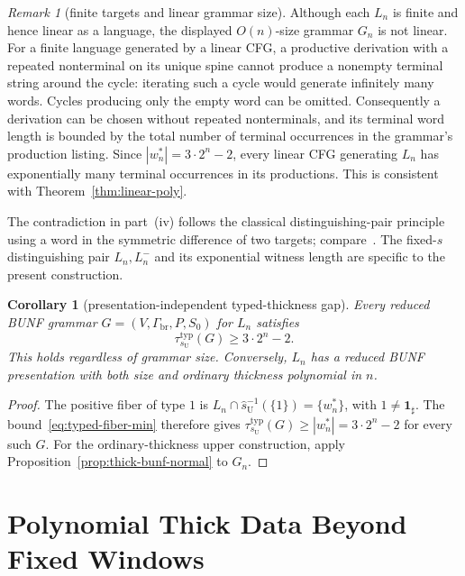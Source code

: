 \documentclass[11pt,a4paper]{article}
\newtheorem{corollary}[theorem]{Corollary}
\theoremstyle{remark}
\newtheorem{remark}[theorem]{Remark}
\theoremstyle{plain}
\begin{document}
\begin{remark}[finite targets and linear grammar size]
Although each $L_n$ is finite and hence linear as a language,
the displayed $O(n)$-size grammar $G_n$ is not linear.
For a finite language generated by a linear CFG, a productive
derivation with a repeated nonterminal on its unique spine
cannot produce a nonempty terminal string around the cycle:
iterating such a cycle would generate infinitely many words.
Cycles producing only the empty word can be omitted.
Consequently a derivation can be chosen without repeated
nonterminals, and its terminal word length is bounded by
the total number of terminal occurrences in the grammar's
production listing. Since $|w_n^*|=3\cdot2^n-2$, every
linear CFG generating $L_n$ has exponentially many terminal
occurrences in its productions. This is consistent with
Theorem~\ref{thm:linear-poly}.
\end{remark}

The contradiction in part~(iv) follows the classical distinguishing-pair
principle using a word in the symmetric difference of two targets;
compare~\cite[Theorem~15.1.4]{higuera2010}.  The fixed-$s$
distinguishing pair $L_n,L_n^-$ and its exponential witness length
are specific to the present construction.

\begin{corollary}[presentation-independent typed-thickness gap]
\label{cor:typed-gap-intrinsic}
Every reduced BUNF grammar $G=(V,\Gamma_{\mathrm{br}},P,S_0)$
for $L_n$ satisfies
\[
 \boxed{\tau_{s_{\mathrm U}}^{\mathrm{typ}}(G)\ge3\cdot2^n-2.}
\]
This holds regardless of grammar size. Conversely, $L_n$
has a reduced BUNF presentation with both size and ordinary
thickness polynomial in $n$.
\end{corollary}
\begin{proof}
The positive fiber of type $1$ is
$L_n\cap\widehat{s}_{\mathrm U}^{-1}(\{1\})=\{w_n^*\}$,
with $1\ne\mathbf{1}_{\sharp}$.
The bound~\eqref{eq:typed-fiber-min} therefore gives
$\tau_{s_{\mathrm U}}^{\mathrm{typ}}(G)\ge
|w_n^*|=3\cdot2^n-2$ for every such $G$.
For the ordinary-thickness upper construction,
apply Proposition~\ref{prop:thick-bunf-normal} to $G_n$.
\end{proof}

\section{Polynomial Thick Data Beyond Fixed Windows}
\label{sec:fixed-window-thick}
\end{document}
